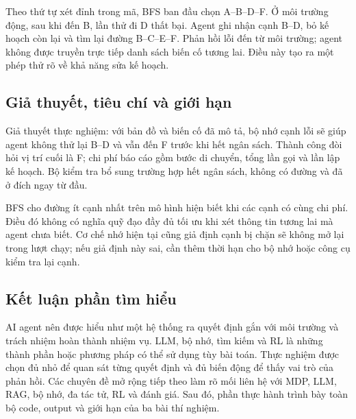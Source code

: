 \documentclass[12pt,a4paper]{article}
\begin{document}
\begin{center}
\end{center}

Theo thứ tự xét đỉnh trong mã, BFS ban đầu chọn A--B--D--F. Ở môi trường động, sau khi
đến B, lần thử đi D thất bại. Agent ghi nhận cạnh B--D, bỏ kế hoạch còn lại và tìm lại
đường B--C--E--F. Phản hồi lỗi đến từ môi trường; agent không được truyền trực tiếp
danh sách biến cố tương lai. Điều này tạo ra một phép thử rõ về khả năng sửa kế hoạch.

\subsection{Giả thuyết, tiêu chí và giới hạn}
Giả thuyết thực nghiệm: với bản đồ và biến cố đã mô tả, bộ nhớ cạnh lỗi sẽ giúp agent
không thử lại B--D và vẫn đến F trước khi hết ngân sách. Thành công đòi hỏi vị trí cuối
là F; chi phí báo cáo gồm bước di chuyển, tổng lần gọi và lần lập kế hoạch. Bộ kiểm tra
bổ sung trường hợp hết ngân sách, không có đường và đã ở đích ngay từ đầu.

BFS cho đường ít cạnh nhất trên mô hình hiện biết khi các cạnh có cùng chi phí.
Điều đó không có nghĩa quỹ đạo đầy đủ tối ưu khi xét thông tin tương lai mà agent chưa
biết. Cơ chế nhớ hiện tại cũng giả định cạnh bị chặn sẽ không mở lại trong lượt chạy;
nếu giả định này sai, cần thêm thời hạn cho bộ nhớ hoặc công cụ kiểm tra lại cạnh.

\subsection{Kết luận phần tìm hiểu}
AI agent nên được hiểu như một hệ thống ra quyết định gắn với môi trường và trách
nhiệm hoàn thành nhiệm vụ. LLM, bộ nhớ, tìm kiếm và RL là những thành phần hoặc phương
pháp có thể sử dụng tùy bài toán. Thực nghiệm được chọn đủ nhỏ để quan sát từng quyết
định và đủ biến động để thấy vai trò của phản hồi. Các chuyên đề mở rộng tiếp theo
làm rõ mối liên hệ với MDP, LLM, RAG, bộ nhớ, đa tác tử, RL và đánh giá. Sau đó, phần
thực hành trình bày toàn bộ code, output và giới hạn của ba bài thí nghiệm.
\end{document}
